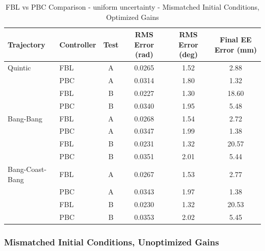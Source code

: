 \documentclass[11pt,a4paper]{article}
\begin{document}
\begin{table}[H]
\centering
\caption{FBL vs PBC Comparison - uniform uncertainty - Mismatched Initial Conditions, Optimized Gains}
\begin{tabular}{llcccc}
\toprule
Trajectory & Controller & Test & RMS Error (rad) & RMS Error (deg) & Final EE Error (mm) \\
\midrule
Quintic & FBL & A & \textcolor{bestcolor}{0.0265} & \textcolor{bestcolor}{1.52} & 2.88 \\
 & PBC & A & 0.0314 & 1.80 & \textcolor{bestcolor}{1.32} \\
 & FBL & B & \textcolor{bestcolor}{0.0227} & \textcolor{bestcolor}{1.30} & 18.60 \\
 & PBC & B & 0.0340 & 1.95 & \textcolor{bestcolor}{5.48} \\
\midrule
Bang-Bang & FBL & A & \textcolor{bestcolor}{0.0268} & \textcolor{bestcolor}{1.54} & 2.72 \\
 & PBC & A & 0.0347 & 1.99 & \textcolor{bestcolor}{1.38} \\
 & FBL & B & \textcolor{bestcolor}{0.0231} & \textcolor{bestcolor}{1.32} & 20.57 \\
 & PBC & B & 0.0351 & 2.01 & \textcolor{bestcolor}{5.44} \\
\midrule
Bang-Coast-Bang & FBL & A & \textcolor{bestcolor}{0.0267} & \textcolor{bestcolor}{1.53} & 2.77 \\
 & PBC & A & 0.0343 & 1.97 & \textcolor{bestcolor}{1.38} \\
 & FBL & B & \textcolor{bestcolor}{0.0230} & \textcolor{bestcolor}{1.32} & 20.53 \\
 & PBC & B & 0.0353 & 2.02 & \textcolor{bestcolor}{5.45} \\
\bottomrule
\end{tabular}
\end{table}

\subsubsection{Mismatched Initial Conditions, Unoptimized Gains}
\end{document}
